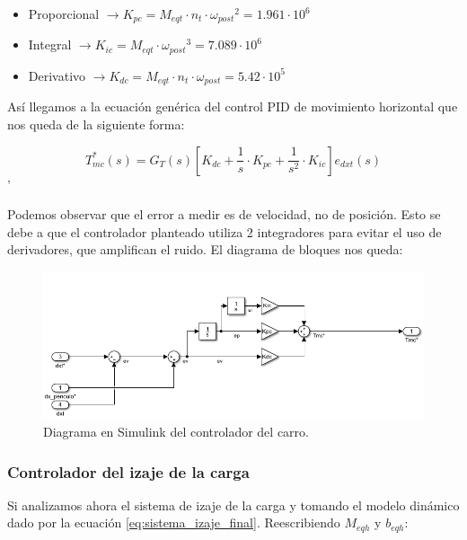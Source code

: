 \documentclass[11pt]{article}
\begin{document}
\begin{itemize}
	\item Proporcional $\rightarrow K_{pc} = M_{eqt}\cdot n_{t}\cdot {\omega_{post}}^{2} = 1.961 \cdot 10^6$
	\item Integral $\rightarrow K_{ic} = M_{eqt}\cdot {\omega_{post}}^{3}  = 7.089 \cdot 10^6$
	\item Derivativo $\rightarrow K_{dc} = M_{eqt}\cdot n_{t}\cdot {\omega_{post}} = 5.42 \cdot 10^5$
\end{itemize}

Así llegamos a la ecuación genérica del control PID de movimiento horizontal que nos queda de la siguiente forma:

\begin{equation}
	\label{eq:sistema_carro_simplificado_laplace_controlador}
	T_{mc}^{*}(s)=G_{T}(s)\left [ K_{dc}+\frac{1}{s}\cdot K_{pc}+\frac{1}{s^{2}}\cdot K_{ic} \right ] e_{dxt}(s)
\end{equation}'

Podemos observar que el error a medir es de velocidad, no de posición. Esto se debe a que el controlador planteado utiliza 2 integradores para evitar el uso de derivadores, que amplifican el ruido. El diagrama de bloques nos queda:

\begin{figure}[h!]
	\centering
	\includegraphics[width=1\textwidth]{images/imagen_12_controlador_carro.png}
	\caption{Diagrama en Simulink del controlador del carro.}
	\label{fig:controlador_carro_simulink}
\end{figure}


\subsubsection{Controlador del izaje de la carga}

Si analizamos ahora el sistema de izaje de la carga y tomando el modelo dinámico dado por la ecuación \ref{eq:sistema_izaje_final}. Reescribiendo $M_{eqh}$ y $b_{eqh}$:
\end{document}
